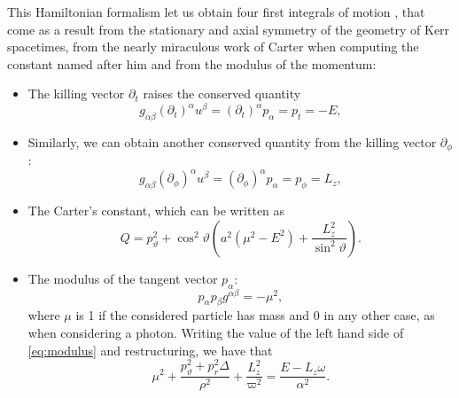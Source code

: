 This Hamiltonian formalism let us obtain four first integrals of motion \cite[pp. 898-899]{thorne73}, that come as a result from the stationary and axial symmetry of the geometry of Kerr spacetimes, from the nearly miraculous work of Carter when computing the constant named after him \cite{carter68} and from the modulus of the momentum:
\begin{itemize}
	\item The killing vector $\partial_t$ raises the conserved quantity
	\begin{equation}
		\label{eq:conservedpt}
		g_{\alpha\beta}(\partial_t)^\alpha u^\beta = (\partial_t)^\alpha p_\alpha = p_t = -E,
	\end{equation}
	\item Similarly, we can obtain another conserved quantity from the killing vector $\partial_\phi$:
	\begin{equation}
		\label{eq:conservedpphi}
		g_{\alpha\beta}(\partial_\phi)^\alpha u^\beta = (\partial_\phi)^\alpha p_\alpha = p_\phi = L_z,
	\end{equation}
	\item The Carter's constant, which can be written as
	\begin{equation}
		\label{eq:carter}
		Q = p_\vartheta^2 + \cos^2\vartheta \left( a^2 \left( \mu^2 - E^2 \right) + \frac{L_z^2}{\sin^2\vartheta} \right).
	\end{equation}
	\item The modulus of the tangent vector $p_\alpha$:
	\begin{equation}
		\label{eq:modulus}
		p_\alpha p_\beta g^{\alpha\beta} = -\mu^2,
	\end{equation}
	where $\mu$ is 1 if the considered particle has mass and 0 in any other case, as when considering a photon. Writing the value of the left hand side of \autoref{eq:modulus} and restructuring, we have that
	\[
		\mu^2 + \frac{p_\vartheta^2 + p_r^2 \Delta}{\rho^2} + \frac{L_z^2}{\varpi^2} = \frac{E - L_z \omega}{\alpha^2}.
	\]
\end{itemize}



